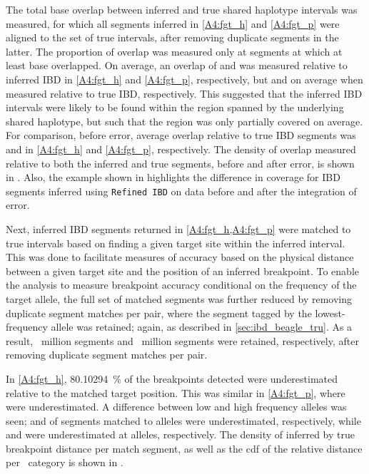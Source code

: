 The total base overlap between inferred and true shared haplotype intervals was measured, for which all segments inferred in \ref{A4:fgt_h} and \ref{A4:fgt_p} were aligned to the set of true intervals, after removing duplicate segments in the latter.
The proportion of overlap was measured only at segments at which at least  base overlapped.
On average, an overlap of  and  was measured relative to inferred IBD in \ref{A4:fgt_h} and \ref{A4:fgt_p}, respectively, but  and  on average when measured relative to true IBD, respectively.
This suggested that the inferred IBD intervals were likely to be found within the region spanned by the underlying shared haplotype, but such that the region was only partially covered on average.
For comparison, before error, average overlap relative to true IBD segments was  and  in \ref{A4:fgt_h} and \ref{A4:fgt_p}, respectively.
The density of overlap measured relative to both the inferred and true segments, before and after error, is shown in .
Also, the example shown in  highlights the difference in coverage for IBD segments inferred using \texttt{Refined\,IBD} on data before and after the integration of error.


Next, inferred IBD segments returned in \cref{A4:fgt_h,A4:fgt_p} were matched to true intervals based on finding a given target site within the inferred interval.
This was done to facilitate measures of accuracy based on the physical distance between a given target site and the position of an inferred breakpoint.
To enable the analysis to measure breakpoint accuracy conditional on the frequency of the target allele, the full set of matched segments was further reduced by removing duplicate segment matches per pair, where the segment tagged by the lowest-frequency allele was retained; again, as described in \cref{sec:ibd_beagle_tru}.
As a result, ~million segments and ~million segments were retained, respectively, after removing duplicate segment matches per pair.


%

%


In \cref{A4:fgt_h}, \SI{80.10294}{\percent} of the breakpoints detected were underestimated relative to the matched target position.
This was similar in \cref{A4:fgt_p}, where  were underestimated.
A difference between low and high frequency alleles was seen;  and  of segments matched to  alleles were underestimated, respectively, while  and  were underestimated at  alleles, respectively.
The density of inferred by true breakpoint distance per match segment, as well as the \gls{cdf} of the relative distance per \fk{}~category is shown in .

